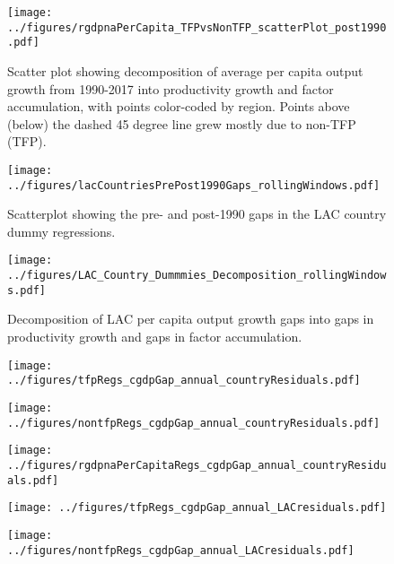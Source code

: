 \documentclass[12pt,english]{article}
\theoremstyle{remark}
\begin{document}
\begin{sidewaysfigure}[ht]
	\texttt{[image: ../figures/rgdpnaPerCapita\_TFPvsNonTFP\_scatterPlot\_post1990.pdf]}
	\caption{Scatter plot showing decomposition of average per capita output growth from 1990-2017 into productivity growth and factor accumulation, with points color-coded by region. Points above (below) the dashed 45 degree line grew mostly due to non-TFP (TFP).}
\end{sidewaysfigure}

\begin{sidewaysfigure}[ht]
	\texttt{[image: ../figures/lacCountriesPrePost1990Gaps\_rollingWindows.pdf]}
	\caption{Scatterplot showing the pre- and post-1990 gaps in the LAC country dummy regressions.}
\end{sidewaysfigure}

\begin{sidewaysfigure}[ht]
	\texttt{[image: ../figures/LAC\_Country\_Dummmies\_Decomposition\_rollingWindows.pdf]}
	\caption{Decomposition of LAC per capita output growth gaps into gaps in productivity growth and gaps in factor accumulation.}
\end{sidewaysfigure}

\begin{sidewaysfigure}[ht]
	\texttt{[image: ../figures/tfpRegs\_cgdpGap\_annual\_countryResiduals.pdf]}
	\caption{}
\end{sidewaysfigure}

\begin{sidewaysfigure}[ht]
	\texttt{[image: ../figures/nontfpRegs\_cgdpGap\_annual\_countryResiduals.pdf]}
	\caption{}
\end{sidewaysfigure}

\begin{sidewaysfigure}[ht]
	\texttt{[image: ../figures/rgdpnaPerCapitaRegs\_cgdpGap\_annual\_countryResiduals.pdf]}
	\caption{}
\end{sidewaysfigure}



\begin{sidewaysfigure}[ht]
	\texttt{[image: ../figures/tfpRegs\_cgdpGap\_annual\_LACresiduals.pdf]}
	\caption{}
\end{sidewaysfigure}

\begin{sidewaysfigure}[ht]
	\texttt{[image: ../figures/nontfpRegs\_cgdpGap\_annual\_LACresiduals.pdf]}
	\caption{}
\end{sidewaysfigure}
\end{document}
